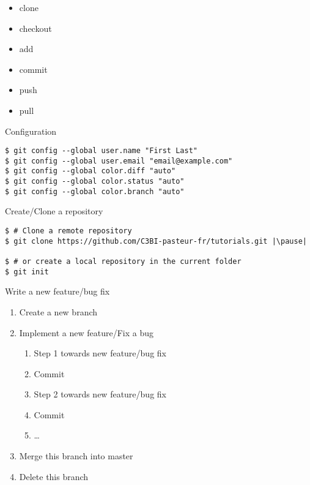 \def\git#1{{\small\color{git}\$ git #1}\\}

\begin{frame}
    \begin{itemize}
        \item clone
        \item  checkout
        \item  add
        \item commit
        \item push
        \item pull
    \end{itemize}
\end{frame}

\begin{frame}[fragile]{Configuration}
	\begin{lstlisting}
$ git config --global user.name "First Last"
$ git config --global user.email "email@example.com"
$ git config --global color.diff "auto"
$ git config --global color.status "auto"
$ git config --global color.branch "auto"
	\end{lstlisting}
\end{frame}

\begin{frame}[fragile]{Create/Clone a repository}
	\begin{lstlisting}
$ # Clone a remote repository
$ git clone https://github.com/C3BI-pasteur-fr/tutorials.git |\pause|

$ # or create a local repository in the current folder
$ git init
	\end{lstlisting}
\end{frame}

\begin{frame}[fragile]{Write a new feature/bug fix}
	\begin{enumerate}
		\item Create a new branch
		\item Implement a new feature/Fix a bug
		\begin{enumerate}
			\item Step 1 towards new feature/bug fix
			\item Commit
			\item Step 2 towards new feature/bug fix
			\item Commit
			\item \ldots
		\end{enumerate}
		\item Merge this branch into master
		\item Delete this branch 
	\end{enumerate}
\end{frame}

